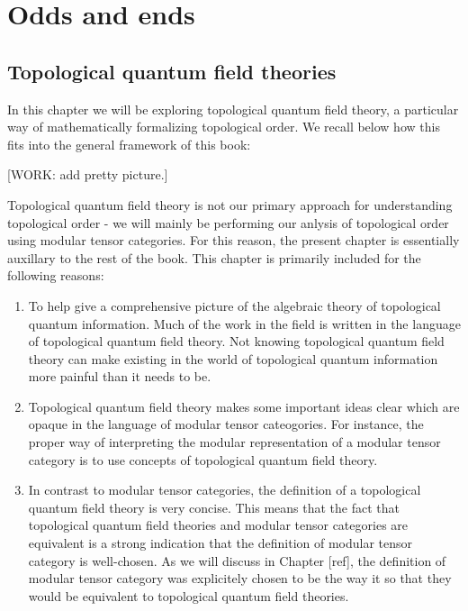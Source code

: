 \section{Odds and ends}

\subsection{Topological quantum field theories}

In this chapter we will be exploring topological quantum field theory, a particular way of mathematically formalizing topological order. We recall below how this fits into the general framework of this book:

[WORK: add pretty picture.]

Topological quantum field theory is not our primary approach for understanding topological order - we will mainly be performing our anlysis of topological order using modular tensor categories. For this reason, the present chapter is essentially auxillary to the rest of the book. This chapter is primarily included for the following reasons:

\begin{enumerate}
\item To help give a comprehensive picture of the algebraic theory of topological quantum information. Much of the work in the field is written in the language of topological quantum field theory. Not knowing topological quantum field theory can make existing in the world of topological quantum information more painful than it needs to be.

\item Topological quantum field theory makes some important ideas clear which are opaque in the language of modular tensor cateogories. For instance, the proper way of interpreting the modular representation of a modular tensor category is to use concepts of topological quantum field theory.

\item In contrast to modular tensor categories, the definition of a topological quantum field theory is very concise. This means that the fact that topological quantum field theories and modular tensor categories are equivalent is a strong indication that the definition of modular tensor category is well-chosen. As we will discuss in Chapter [ref], the definition of modular tensor category was explicitely chosen to be the way it so that they would be equivalent to topological quantum field theories.
\end{enumerate}

